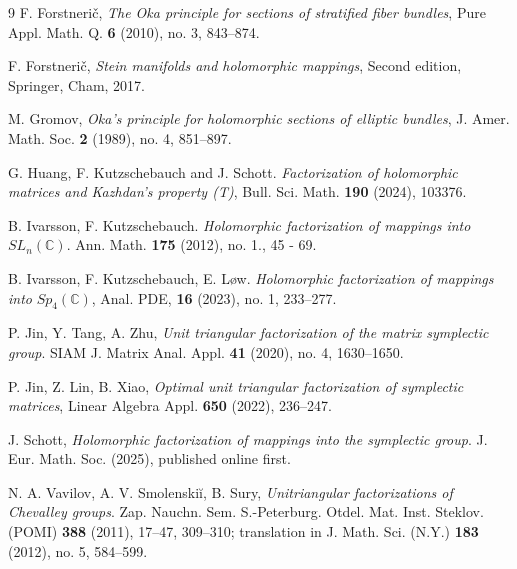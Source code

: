 \documentclass[10pt]{amsart}
\theoremstyle{remark}
\begin{document}
\begin{thebibliography}{9}
 F. Forstneri{\v c}, \textit{The Oka principle for sections of stratified fiber bundles}, Pure Appl.
Math. Q. \textbf{6} (2010), no. 3, 843–874. 


 F. Forstneri{\v c}, \textit{Stein manifolds and holomorphic mappings}, Second edition, Springer, Cham, 2017.


 M. Gromov, \textit{Oka’s principle for holomorphic sections of elliptic bundles}, J. Amer. Math. Soc. \textbf{2} (1989), no. 4, 851–897.

G. Huang, F. Kutzschebauch and J. Schott. \textit{Factorization of holomorphic matrices and Kazhdan's property (T)}, Bull. Sci. Math. \textbf{190} (2024), 103376.


B. Ivarsson, F. Kutzschebauch. \textit{Holomorphic factorization of mappings into }$SL_n(\mathbb{C})$. Ann. Math. \textbf{175} (2012), no. 1., 45 - 69.

B. Ivarsson, F. Kutzschebauch, E. Løw. \textit{Holomorphic factorization of mappings into }$Sp_4(\mathbb{C})$, Anal. PDE, \textbf{16} (2023), no. 1, 233–277.

    P. Jin, Y. Tang, A. Zhu, 
    \textit{Unit triangular factorization of the matrix symplectic group}. SIAM J. Matrix Anal. Appl. \textbf{41} (2020), no. 4, 1630–1650.
    
    P. Jin, Z. Lin, B. Xiao, 
    \textit{Optimal unit triangular factorization of symplectic matrices}, Linear Algebra Appl. \textbf{650} (2022), 236–247.
   

    J. Schott,
    \textit{Holomorphic factorization of mappings into the symplectic group}. J. Eur. Math. Soc. (2025), published online first.
    
    N. A. Vavilov, A. V. Smolenskiĭ, B. Sury, 
    \textit{Unitriangular factorizations of Chevalley groups}. 
    Zap. Nauchn. Sem. S.-Peterburg. Otdel. Mat. Inst. Steklov. (POMI) 
    \textbf{388} (2011), 17–47, 309–310; translation in
    J. Math. Sci. (N.Y.) \textbf{183} (2012), no. 5, 584–599.

\end{thebibliography}
\end{document}
